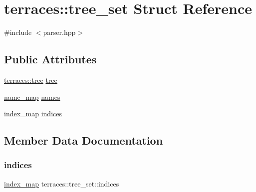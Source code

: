 \hypertarget{structterraces_1_1tree__set}{}\section{terraces\+:\+:tree\+\_\+set Struct Reference}
\label{structterraces_1_1tree__set}


{\ttfamily \#include $<$parser.\+hpp$>$}

\subsection*{Public Attributes}
\begin{DoxyCompactItemize}
\item 
\hyperlink{namespaceterraces_a07aaf7feec4a22c6cdefc14c5a81bdd0}{terraces\+::tree} \hyperlink{structterraces_1_1tree__set_abdce12c87cab9633ad5f8ae735ce6007}{tree}
\item 
\hyperlink{namespaceterraces_a4ef0217fe5aed881737d9bc5a8d45dca}{name\+\_\+map} \hyperlink{structterraces_1_1tree__set_ab9ca9d14518314055ffb7ea450bacc6b}{names}
\item 
\hyperlink{namespaceterraces_a148f3e895119c2a72d995caae669e40d}{index\+\_\+map} \hyperlink{structterraces_1_1tree__set_a35996bc322c09773259be8b51b1944fa}{indices}
\end{DoxyCompactItemize}


\subsection{Member Data Documentation}
\mbox{\label{structterraces_1_1tree__set_a35996bc322c09773259be8b51b1944fa}} 
\subsubsection{\texorpdfstring{indices}{indices}}
{\footnotesize\ttfamily \hyperlink{namespaceterraces_a148f3e895119c2a72d995caae669e40d}{index\+\_\+map} terraces\+::tree\+\_\+set\+::indices}

\mbox{\label{structterraces_1_1tree__set_ab9ca9d14518314055ffb7ea450bacc6b}} 
